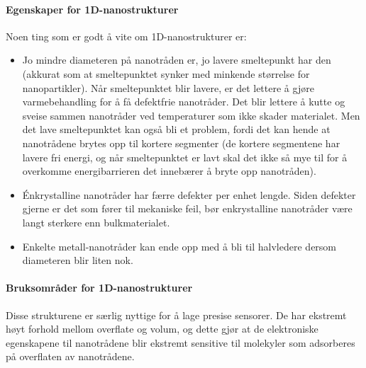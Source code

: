 \paragraph{Egenskaper for 1D-nanostrukturer} Noen ting som er godt å vite om 1D-nanostrukturer er:
\begin{itemize}
	\item Jo mindre diameteren på nanotråden er, jo lavere smeltepunkt har den (akkurat som at smeltepunktet synker med minkende størrelse for nanopartikler). Når smeltepunktet blir lavere, er det lettere å gjøre varmebehandling for å få defektfrie nanotråder. Det blir lettere å kutte og sveise sammen nanotråder ved temperaturer som ikke skader materialet. Men det lave smeltepunktet kan også bli et problem, fordi det kan hende at nanotrådene brytes opp til kortere segmenter (de kortere segmentene har lavere fri energi, og når smeltepunktet er lavt skal det ikke så mye til for å overkomme energibarrieren det innebærer å bryte opp nanotråden).
	\item Énkrystalline nanotråder har færre defekter per enhet lengde. Siden defekter gjerne er det som fører til mekaniske feil, bør enkrystalline nanotråder være langt sterkere enn bulkmaterialet.
	\item Enkelte metall-nanotråder kan ende opp med å bli til halvledere dersom diameteren blir liten nok.
\end{itemize}

\paragraph{Bruksområder for 1D-nanostrukturer} Disse strukturene er særlig nyttige for å lage presise sensorer. De har ekstremt høyt forhold mellom overflate og volum, og dette gjør at de elektroniske egenskapene til nanotrådene blir ekstremt sensitive til molekyler som adsorberes på overflaten av nanotrådene. 

